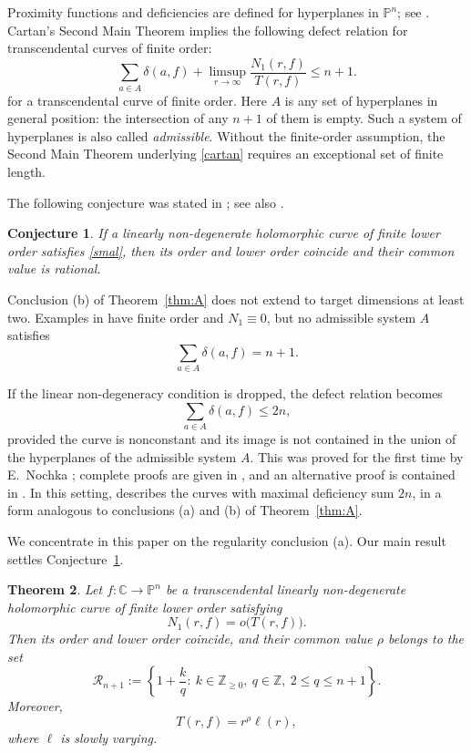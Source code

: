 \documentclass[11pt,letterpaper,reqno]{amsart}
\newtheorem{thm}{Theorem}[section]
\newtheorem{conj}[thm]{Conjecture}
\theoremstyle{remark}
\numberwithin{equation}{section}
\newcommand{\C}{\mathbb C}
\newcommand{\Z}{\mathbb Z}
\newcommand{\PP}{\mathbb P}
\begin{document}
Proximity functions and deficiencies are defined for hyperplanes in
$\PP^n$; see \cite{Car33,Ru21}. Cartan's Second Main Theorem
\cite[Theorem~7.1, equation~(7.3)]{GH04}
implies the following defect relation for transcendental curves of finite order:
\begin{equation}\label{cartan}
 \sum_{a\in A}\delta(a,f)
 +\limsup_{r\to\infty}\frac{N_1(r,f)}{T(r,f)}\le n+1.
\end{equation}
for a transcendental curve of finite order. 
Here $A$ is any set of
hyperplanes in general position: the intersection of any \(n+1\) of them is
empty. Such a system of hyperplanes is also called \emph{admissible}. 
Without the
finite-order assumption, the Second Main Theorem underlying \eqref{cartan}
requires
an exceptional set of finite length.

The following conjecture was stated in \cite[Section~1]{Ere98}; see also \cite{Ere15}.

\begin{conj}\label{conj:regularity}
If a linearly non-degenerate holomorphic curve of finite lower order
satisfies \eqref{smal}, then its order and lower order coincide and their
common value is rational.
\end{conj}

Conclusion (b) of Theorem~\ref{thm:A} does not extend to
target dimensions at least
two. Examples in \cite{Ere98}
have finite order and $N_1\equiv0$, but no
admissible system $A$ satisfies
\[
 \sum_{a\in A}\delta(a,f)=n+1.
\]

If the linear non-degeneracy condition is dropped, the defect relation becomes
\[
 \sum_{a\in A}\delta(a,f)\leq2n,
\]
provided the curve is nonconstant and its image is not contained in the
union of the hyperplanes of the admissible system $A$.
This was proved for the first time by E.~Nochka \cite{Noc83}; complete proofs
are given in
\cite{Voj97,Ru21}, and an alternative proof is contained in \cite{ES92}.
In this setting, \cite{Ere98} describes the curves with maximal
deficiency sum $2n$, in a form analogous to conclusions (a) and (b)
of Theorem~\ref{thm:A}.

We concentrate in this paper on the regularity conclusion (a).
Our main result
settles Conjecture~\ref{conj:regularity}. 

\begin{thm}\label{thm:main}
Let $f:\C\to\PP^{n}$ be a transcendental linearly non-degenerate
holomorphic curve of finite lower order satisfying
\begin{equation}\label{eq:mainhyp}
 N_1(r,f)=o\bigl(T(r,f)\bigr).
\end{equation}
Then its order and lower order coincide, and their common value $\rho$
belongs to the set
\begin{equation}\label{ord}
 \mathcal R_{n+1}:=\left\{1+\frac{k}{q}:\ k\in\Z_{\ge0},\
                           q\in\Z,\ 2\leq q\leq n+1\right\}.
\end{equation}
Moreover,
\begin{equation}\label{reg}
 T(r,f)=r^\rho\ell(r),
\end{equation}
where $\ell$ is slowly varying. 
\end{thm}
\end{document}
